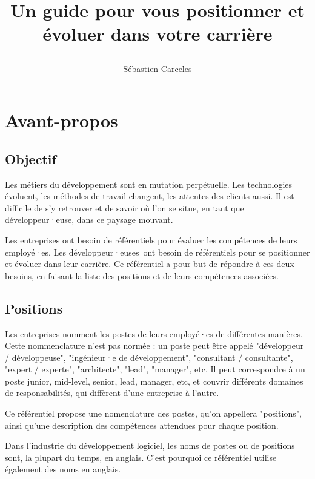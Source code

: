 \documentclass[a4paper, french, openany, 12pt]{book}
\title{
  \vspace*{-8cm}

  \fullwidthimage{images/cover.jpg}

  \vspace*{5cm}

  \bsc{Référenciel de compétences pour développeurs et développeuses}

  Un guide pour vous positionner et évoluer dans votre carrière
}
\author{Sébastien Carceles}
\date{}
\newcommand\dev{développeur·euse}
\newcommand\devs{développeur·euses}
\begin{document}
\begin{titlepage}
  \maketitle
\end{titlepage}

\frontmatter

\chapter{Avant-propos}

\begin{multicols}{2}
  
  \section*{Objectif}
  
  Les métiers du développement sont en mutation perpétuelle.
  Les technologies évoluent, les méthodes de travail changent, les attentes des clients aussi.
  Il est difficile de s'y retrouver et de savoir où l'on se situe, en tant que \dev, dans ce paysage mouvant.
  
  Les entreprises ont besoin de référentiels pour évaluer les compétences de leurs employé·es.
  Les \devs\ ont besoin de référentiels pour se positionner et évoluer dans leur carrière.
  Ce référentiel a pour but de répondre à ces deux besoins, en faisant la liste des positions et de leurs compétences
  associées.
  
  \section*{Positions}
  
  Les entreprises nomment les postes de leurs employé·es de différentes manières.
  Cette nommenclature n'est pas normée : un poste peut être appelé "développeur / développeuse", "ingénieur·e de 
  développement", "consultant / consultante", "expert / experte", "architecte", "lead", "manager", etc.
  Il peut correspondre à un poste junior, mid-level, senior, lead, manager, etc, et couvrir différents domaines de 
  responsabilités, qui diffèrent d'une entreprise à l'autre.
  
  Ce référentiel propose une nomenclature des postes, qu'on appellera "positions",
  ainsi qu'une description des compétences attendues pour chaque position.
  
  Dans l'industrie du développement logiciel, les noms de postes ou de positions sont, la plupart du temps, en anglais.
  C'est pourquoi ce référentiel utilise également des noms en anglais.


\end{multicols}
\end{document}
